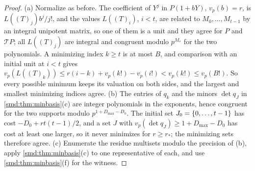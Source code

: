 
\begin{proof}
(a) Normalize as before. The coefficient of $Y^j$ in $P(1+bY)$, $v_p(b)=r$, is
$L((T)_j)b^j/j!$, and the values $L((T)_i)$, $i<t$, are related to $M_0,\dots,M_{t-1}$ by an
integral unipotent matrix, so one of them is a unit and they agree for $P$ and $\mathcal TP$;
all $L((T)_j)$ are integral and congruent modulo $p^{M_*}$ for the two polynomials. A minimizing
index $k\ge t$ is at most $B$, and comparison with an initial unit at $i<t$ gives
$v_p(L((T)_k))\le r(i-k)+v_p(k!)-v_p(i!)<v_p(k!)\le v_p(B!)$. So every possible minimum keeps
its valuation on both sides, and the largest and smallest minimizing indices agree. (b) The
entries of $q_k$ and the minors $\det q_J$ in \cref{smd:thm:minbasis}(c) are integer polynomials
in the exponents, hence congruent for the two supports modulo $p^{1+D_{\max}-D_0}$. The initial
set $J_0=\{0,\dots,t-1\}$ has cost $-D_0+rt(t-1)/2$, and a set $J$ with
$v_p(\det q_J)\ge1+D_{\max}-D_0$ has cost at least one larger, so it never minimizes for
$r\ge r_*$; the minimizing sets therefore agree. (c) Enumerate the residue multisets modulo the
precision of (b), apply \cref{smd:thm:minbasis}(c) to one representative of each, and use
\cref{smd:thm:minbasis}(f) for the witness.
\end{proof}

